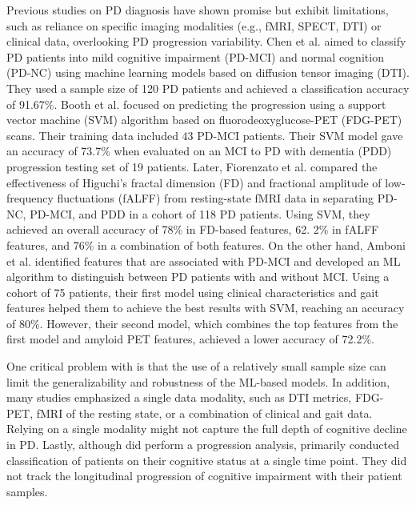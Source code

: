\documentclass{article}
\begin{document}
Previous studies on PD diagnosis have shown promise but exhibit limitations, such as reliance on specific imaging modalities (e.g., fMRI, SPECT, DTI) or clinical data, overlooking PD progression variability. Chen et al. \cite{chen2023detection} aimed to classify PD patients into mild cognitive impairment (PD-MCI) and normal cognition (PD-NC) using machine learning models based on diffusion tensor imaging (DTI). They used a sample size of 120 PD patients and achieved a classification accuracy of 91.67\%. Booth et al. \cite{booth2022predicting} focused on predicting the progression using a support vector machine (SVM) algorithm based on fluorodeoxyglucose-PET (FDG-PET) scans. Their training data included 43 PD-MCI patients. Their SVM model gave an accuracy of 73.7\% when evaluated on an MCI to PD with dementia (PDD) progression testing set of 19 patients. Later, Fiorenzato et al. \cite{fiorenzato2024brain} compared the effectiveness of Higuchi's fractal dimension (FD) and fractional amplitude of low-frequency fluctuations (fALFF) from resting-state fMRI data in separating PD-NC, PD-MCI, and PDD in a cohort of 118 PD patients. Using SVM, they achieved an overall accuracy of 78\% in FD-based features, 62. 2\% in fALFF features, and 76\% in a combination of both features. On the other hand, Amboni et al. \cite{amboni2022machine} identified features that are associated with PD-MCI and developed an ML algorithm to distinguish between PD patients with and without MCI. Using a cohort of 75 patients, their first model using clinical characteristics and gait features helped them to achieve the best results with SVM, reaching an accuracy of 80\%. However, their second model, which combines the top features from the first model and amyloid PET features, achieved a lower accuracy of 72.2\%.

One critical problem with \cite{chen2023detection, booth2022predicting, fiorenzato2024brain, amboni2022machine} is that the use of a relatively small sample size can limit the generalizability and robustness of the ML-based models. In addition, many studies emphasized a single data modality, such as DTI metrics, FDG-PET, fMRI of the resting state, or a combination of clinical and gait data. Relying on a single modality might not capture the full depth of cognitive decline in PD. Lastly, although \cite{booth2022predicting} did perform a progression analysis, \cite{chen2023detection, fiorenzato2024brain, amboni2022machine} primarily conducted classification of patients on their cognitive status at a single time point. They did not track the longitudinal progression of cognitive impairment with their patient samples.
\end{document}
